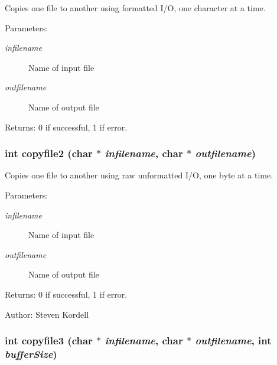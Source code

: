 Copies one file to another using formatted I/O, one character at a time. \begin{Desc}
\item[Parameters:]
\begin{description}
\item[{\em infilename}]Name of input file \item[{\em outfilename}]Name of output file \end{description}
\end{Desc}
\begin{Desc}
\item[Returns:]0 if successful, 1 if error. \end{Desc}
\subsubsection{\setlength{\rightskip}{0pt plus 5cm}int copyfile2 (char $\ast$ {\em infilename}, char $\ast$ {\em outfilename})}\label{cptest_8c_88b74a1f2a04a2c3e85579164ce6f232}


Copies one file to another using raw unformatted I/O, one byte at a time. \begin{Desc}
\item[Parameters:]
\begin{description}
\item[{\em infilename}]Name of input file \item[{\em outfilename}]Name of output file \end{description}
\end{Desc}
\begin{Desc}
\item[Returns:]0 if successful, 1 if error. \end{Desc}
\begin{Desc}
\item[Author:]Steven Kordell \end{Desc}
\subsubsection{\setlength{\rightskip}{0pt plus 5cm}int copyfile3 (char $\ast$ {\em infilename}, char $\ast$ {\em outfilename}, int {\em buffer\-Size})}\label{cptest_8c_dbd02f3bb54fb307240b8194673d1722}


